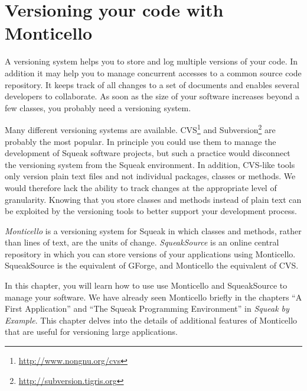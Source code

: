 \documentclass[a4paper,10pt,twoside]{book}
\begin{document}
	\sloppy
\fi

\newcommand{\MC}{Monticello\xspace}
\newcommand{\MCB}{\MC browser\xspace}
\newcommand{\RI}{repository inspector\xspace}

\chapter{Versioning your code with \MC}


A versioning system helps you to store and log multiple versions of your code. In addition it may help you to manage concurrent accesses to a common source code repository. It keeps track of all changes to a set of documents and enables several developers to collaborate. As soon as the size of your software increases beyond a few classes, you probably need a versioning system.

Many different versioning systems are available. CVS\footnote{\url{http://www.nongnu.org/cvs}} and Subversion\footnote{\url{http://subversion.tigris.org}} are probably the most popular.
In principle you could use them to manage the development of Squeak software projects, but such a practice would disconnect the versioning system from the Squeak environment.
In addition, CVS-like tools only version plain text files and not individual packages, classes or methods. We would therefore lack the ability to track changes at the appropriate level of granularity. Knowing that you store classes and methods instead of plain text can be exploited by the versioning tools to better support your development process.


\emph{\MC{}} is  a versioning system for Squeak in which classes and methods, rather than lines of text,
are the units of change. \emph{SqueakSource} is an online central repository in which you can store versions of your applications using \MC. SqueakSource is the equivalent of GForge, and \MC the equivalent of CVS. 

In this chapter, you will learn how to use use \MC and SqueakSource to manage your software. We have already seen \MC briefly in the chapters ``A First Application'' and ``The Squeak Programming Environment'' in \emph{Squeak by Example}. This chapter delves into the details of additional features of \MC that are useful for versioning large applications.
\end{document}
